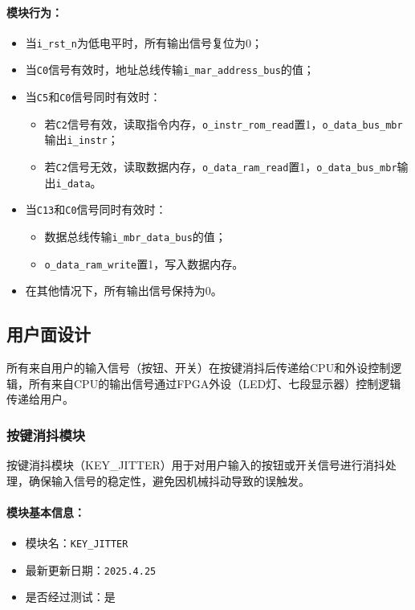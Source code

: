 \documentclass[lang=cn,a4paper,newtx]{elegantpaper}
\begin{document}
\paragraph{模块行为：}
\begin{itemize}
  \item 当\texttt{i\_rst\_n}为低电平时，所有输出信号复位为0；
  \item 当\texttt{C0}信号有效时，地址总线传输\texttt{i\_mar\_address\_bus}的值；
  \item 当\texttt{C5}和\texttt{C0}信号同时有效时：
    \begin{itemize}
      \item 若\texttt{C2}信号有效，读取指令内存，\texttt{o\_instr\_rom\_read}置1，\texttt{o\_data\_bus\_mbr}输出\texttt{i\_instr}；
      \item 若\texttt{C2}信号无效，读取数据内存，\texttt{o\_data\_ram\_read}置1，\texttt{o\_data\_bus\_mbr}输出\texttt{i\_data}。
    \end{itemize}
  \item 当\texttt{C13}和\texttt{C0}信号同时有效时：
    \begin{itemize}
      \item 数据总线传输\texttt{i\_mbr\_data\_bus}的值；
      \item \texttt{o\_data\_ram\_write}置1，写入数据内存。
    \end{itemize}
  \item 在其他情况下，所有输出信号保持为0。
\end{itemize}
\subsection{用户面设计}
所有来自用户的输入信号（按钮、开关）在按键消抖后传递给CPU和外设控制逻辑，所有来自CPU的输出信号通过FPGA外设（LED灯、七段显示器）控制逻辑传递给用户。
\subsubsection{按键消抖模块}
按键消抖模块（KEY\_JITTER）用于对用户输入的按钮或开关信号进行消抖处理，确保输入信号的稳定性，避免因机械抖动导致的误触发。

\paragraph{模块基本信息：}
\begin{itemize}
  \item 模块名：\texttt{KEY\_JITTER}
  \item 最新更新日期：\texttt{2025.4.25}
  \item 是否经过测试：是
\end{itemize}
\end{document}
